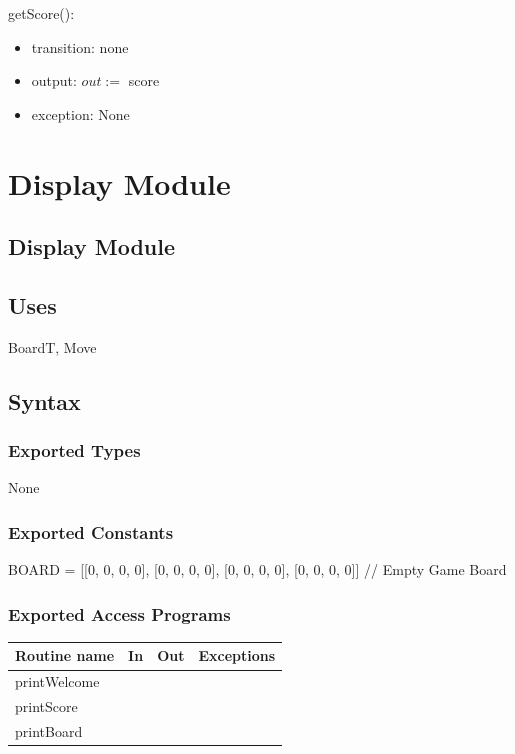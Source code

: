 \documentclass[12pt]{article}
\begin{document}
\noindent getScore():
\begin{itemize}
\item transition: none
\item output: $out :=$ score
\item exception: None
\end{itemize}

\newpage

\section* {Display Module}

\subsection* {Display Module}

\subsection* {Uses}

BoardT, Move

\subsection* {Syntax}

\subsubsection* {Exported Types}

None

\subsubsection* {Exported Constants}

BOARD = [[0, 0, 0, 0], [0, 0, 0, 0], [0, 0, 0, 0], [0, 0, 0, 0]] 	// Empty Game Board

\subsubsection* {Exported Access Programs}

\begin{tabular}{| l | l | l | p{6cm} |}
\hline
\textbf{Routine name} & \textbf{In} & \textbf{Out} & \textbf{Exceptions}\\
\hline
printWelcome & ~ & ~ & \\
\hline
printScore & ~ & ~ & \\
\hline
printBoard & ~ & ~ & \\
\hline
\end{tabular}
\end{document}

